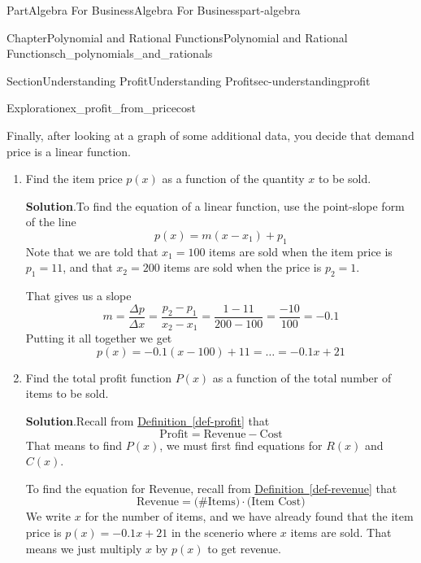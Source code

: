 \documentclass{tufte-book}
\newcommand{\blocktitlefont}{\relax}
\newcommand{\xreffont}{\relax}
\numberwithin{equation}{chapter}
\begin{document}
\begin{partptx}{Part}{Algebra For Business}{}{Algebra For Business}{}{}{part-algebra}
\begin{chapterptx}{Chapter}{Polynomial and Rational Functions}{}{Polynomial and Rational Functions}{}{}{ch_polynomials_and_rationals}
\begin{sectionptx}{Section}{Understanding Profit}{}{Understanding Profit}{}{}{sec-understandingprofit}
\begin{exploration}{Exploration}{}{ex_profit_from_pricecost}
\par
Finally, after looking at a graph of some additional data, you decide that demand price is a linear function.%
\begin{enumerate}[font=\bfseries,label=(\alph*),ref=\alph*]%
\item{}Find the item price \(p(x)\) as a function of the quantity \(x\) to be sold.%
\par\smallskip%
\noindent\textbf{\blocktitlefont Solution}.\hypertarget{ex_profit_from_pricecost-2-2}{}\quad{}To find the equation of a linear function, use the point-slope form of the line%
\begin{equation*}
p(x) = m (x-x_1) + p_1
\end{equation*}
Note that we are told that \(x_1=100\) items are sold when the item price is \(p_1=11\), and that \(x_2=200\) items are sold when the price is \(p_2=1\).%
\par
That gives us a slope%
\begin{equation*}
m = \dfrac{\Delta p}{\Delta x} = \dfrac{p_2-p_1}{x_2-x_1} = \dfrac{1-11}{200-100} = \dfrac{-10}{100} = -0.1
\end{equation*}
Putting it all together we get%
\begin{equation*}
p(x) = -0.1 (x-100) + 11 = \dots = -0.1x + 21
\end{equation*}
%
\item{}Find the total profit function \(P(x)\) as a function of the total number of items to be sold.%
\par\smallskip%
\noindent\textbf{\blocktitlefont Solution}.\hypertarget{ex_profit_from_pricecost-3-2}{}\quad{}Recall from \hyperref[def-profit]{Definition~{\xreffont\ref{def-profit}}} that%
\begin{equation*}
\text{Profit} = \text{Revenue} - \text{Cost}
\end{equation*}
That means to find \(P(x)\), we must first find equations for \(R(x)\) and \(C(x)\).%
\par
To find the equation for Revenue, recall from \hyperref[def-revenue]{Definition~{\xreffont\ref{def-revenue}}} that%
\begin{equation*}
\text{Revenue} = \Big(\text{\# Items}\Big) \cdot \Big(\text{Item Cost}\Big)
\end{equation*}
We write \(x\) for the number of items, and we have already found that the item price is \(p(x) = -0.1x + 21 \) in the scenerio where \(x\) items are sold.  That means we just multiply \(x\) by \(p(x)\) to get revenue.%
\begin{equation*}

\end{equation*}
\end{enumerate}
\end{exploration}
\end{sectionptx}
\end{chapterptx}
\end{partptx}
\end{document}
